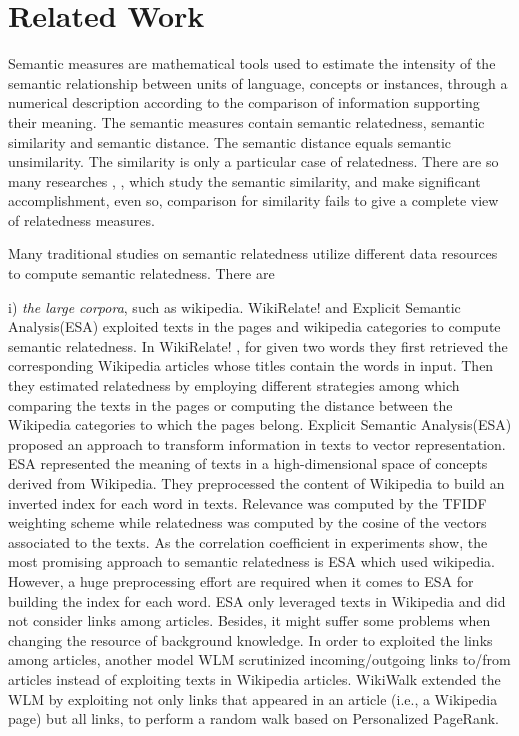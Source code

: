 \section{Related Work}
\label{related-word}
Semantic measures are mathematical tools used to estimate the intensity of the 
semantic relationship between units of language, concepts or instances, through 
a numerical description according to the comparison of information 
supporting their meaning. The semantic measures contain semantic relatedness,
semantic similarity and semantic distance. The semantic distance equals semantic 
unsimilarity. The similarity is only a particular case of relatedness.
There are so many researches \cite{acl/IacobacciPN15}, \cite{tkde/LiBM03}, \cite{tkde/ZhuI17}
which study the semantic similarity, and make significant accomplishment, even so,
comparison for similarity fails to give a complete view of relatedness measures.

Many traditional studies on semantic relatedness utilize different data resources
to compute semantic relatedness. There are

i) \emph{the large corpora}, such as wikipedia. 
WikiRelate! \cite{aaai/StrubeP06} and  Explicit Semantic Analysis(ESA)\cite{ijcai/GabrilovichM07} exploited
texts in the pages and wikipedia categories to compute semantic relatedness.
In WikiRelate! \cite{aaai/StrubeP06}, for given two words
they first retrieved the corresponding Wikipedia articles whose titles contain the words in input. Then they estimated relatedness by
employing different strategies among which comparing the texts in the pages or computing the distance between the Wikipedia categories
to which the pages belong.
Explicit Semantic Analysis(ESA)\cite{ijcai/GabrilovichM07} proposed an approach to transform information in texts to vector representation. 
ESA represented the meaning of texts in a high-dimensional space of concepts derived from Wikipedia.
They preprocessed the content of Wikipedia to build an inverted index for each word in texts.
Relevance was computed by the TFIDF weighting scheme while relatedness was computed by
the cosine of the vectors associated to the texts.
As the correlation coefficient in experiments show, the most promising approach to semantic relatedness is ESA which used wikipedia. 
However, a huge preprocessing effort are required when it comes to ESA for building the index for each word.
ESA only leveraged texts in Wikipedia and did not consider links among articles.
Besides, it might suffer some problems when changing the resource of background knowledge.
In order to exploited the links among articles,
another model WLM \cite{aaai/Milne08} scrutinized incoming/outgoing links to/from articles instead of
exploiting texts in Wikipedia articles. WikiWalk \cite{textgraphs/YehRMAS09} extended the WLM by exploiting
not only links that appeared in an article (i.e., a Wikipedia page) but all links, to perform a random walk
based on Personalized PageRank.

